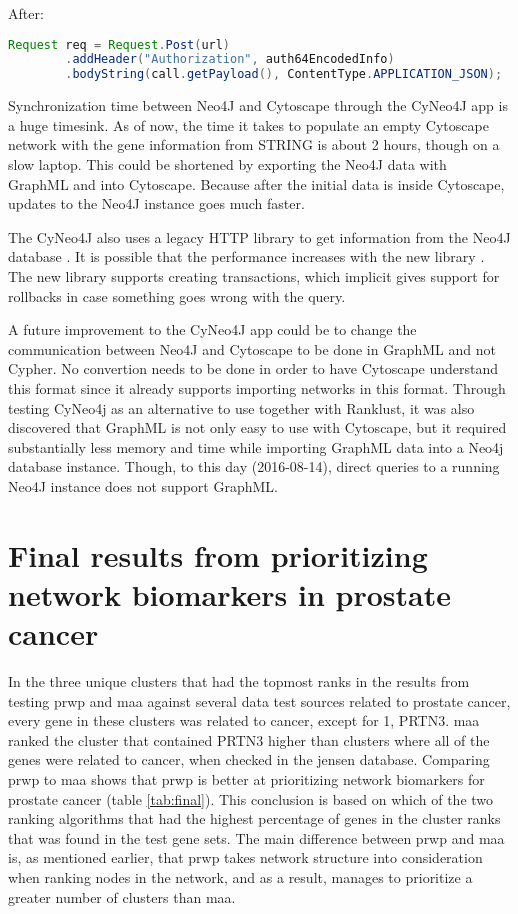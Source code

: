 After:
\begin{lstlisting}[frame=single,language=Java]
Request req = Request.Post(url)
        .addHeader("Authorization", auth64EncodedInfo)
        .bodyString(call.getPayload(), ContentType.APPLICATION_JSON);
\end{lstlisting}

Synchronization time between Neo4J and Cytoscape through the CyNeo4J app is a
huge timesink. As of now, the time it takes to populate an empty Cytoscape
network with the gene information from STRING is about 2 hours, though on a slow
laptop. This could be shortened by exporting the Neo4J data with GraphML and
into Cytoscape. Because after the initial data is inside Cytoscape, updates to
the Neo4J instance goes much faster.

The CyNeo4J also uses a legacy HTTP library to get information from the Neo4J
database \cite{legacy-neo4j}. It is possible that the performance increases with
the new library \cite{transactional-neo4j}. The new library supports creating
transactions, which implicit gives support for rollbacks in case something goes
wrong with the query.

A future improvement to the CyNeo4J app could be to change the communication
between Neo4J and Cytoscape to be done in GraphML and not Cypher. No convertion
needs to be done in order to have Cytoscape understand this format since it
already supports importing networks in this format. Through testing CyNeo4j as
an alternative to use together with Ranklust, it was also discovered that
GraphML is not only easy to use with Cytoscape, but it required substantially
less memory and time while importing GraphML data into a Neo4j database
instance. Though, to this day (2016-08-14), direct queries to a running Neo4J
instance does not support GraphML.

\section{Final results from prioritizing network biomarkers in prostate cancer}
In the three unique clusters that had the topmost ranks in the results from
testing \gls{prwp} and \gls{maa} against several data test sources related to
prostate cancer, every gene in these clusters was related to cancer, except for
1, PRTN3. \gls{maa} ranked the cluster that contained PRTN3 higher than clusters
where all of the genes were related to cancer, when checked in the \gls{jensen}
database. Comparing \gls{prwp} to \gls{maa} shows that \gls{prwp} is
better at prioritizing network biomarkers for prostate cancer
(table \ref{tab:final}). This conclusion is based on which of the two ranking
algorithms that had the highest percentage of genes in the cluster ranks that
was found in the test gene sets. The main difference between \gls{prwp} and
\gls{maa} is, as mentioned earlier, that \gls{prwp} takes network structure into
consideration when ranking nodes in the network, and as a result, manages to
prioritize a greater number of clusters than \gls{maa}.
